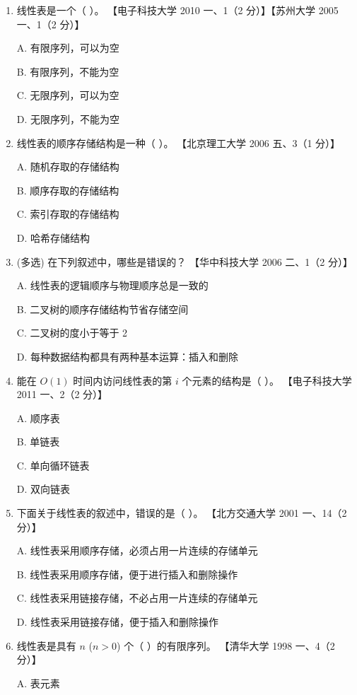\documentclass[lang=cn,newtx,10pt,scheme=chinese]{elegantbook}
\begin{document}
\begin{enumerate}
    \item 线性表是一个（ ）。  
    【电子科技大学 2010 一、1（2 分）】【苏州大学 2005 一、1（2 分）】  

    A. 有限序列，可以为空  

    B. 有限序列，不能为空  

    C. 无限序列，可以为空  

    D. 无限序列，不能为空  

    \item 线性表的顺序存储结构是一种（ ）。  
    【北京理工大学 2006 五、3（1 分）】  

    A. 随机存取的存储结构  

    B. 顺序存取的存储结构  

    C. 索引存取的存储结构  

    D. 哈希存储结构  


    \item (多选) 在下列叙述中，哪些是错误的？  
    【华中科技大学 2006 二、1（2 分）】 

    A. 线性表的逻辑顺序与物理顺序总是一致的  

    B. 二叉树的顺序存储结构节省存储空间  

    C. 二叉树的度小于等于 2  

    D. 每种数据结构都具有两种基本运算：插入和删除  

    \item 能在 $O(1)$ 时间内访问线性表的第 $i$ 个元素的结构是（ ）。  
    【电子科技大学 2011 一、2（2 分）】  

    A. 顺序表  

    B. 单链表  

    C. 单向循环链表  

    D. 双向链表  

    \item 下面关于线性表的叙述中，错误的是（ ）。  
    【北方交通大学 2001 一、14（2 分）】  

    A. 线性表采用顺序存储，必须占用一片连续的存储单元  

    B. 线性表采用顺序存储，便于进行插入和删除操作  

    C. 线性表采用链接存储，不必占用一片连续的存储单元  

    D. 线性表采用链接存储，便于插入和删除操作  

    \item 线性表是具有 $n$ ($n > 0$) 个（ ）的有限序列。  
    【清华大学 1998 一、4（2 分）】  

    A. 表元素  


\end{enumerate}
\end{document}
